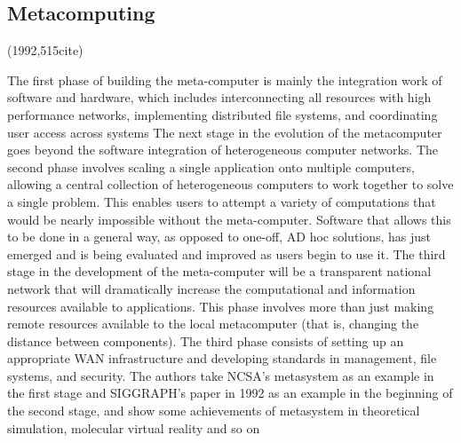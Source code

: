 \documentclass[a4paper,twoside]{scrbook}
\begin{document}
\subsection{Metacomputing \cite{smarr1992metacomputing}}
(1992,515cite)\par
The first phase of building the meta-computer is mainly the integration work of software and hardware, which includes interconnecting all resources with high performance networks, implementing distributed file systems, and coordinating user access across systems
The next stage in the evolution of the metacomputer goes beyond the software integration of heterogeneous computer networks. The second phase involves scaling a single application onto multiple computers, allowing a central collection of heterogeneous computers to work together to solve a single problem. This enables users to attempt a variety of computations that would be nearly impossible without the meta-computer. Software that allows this to be done in a general way, as opposed to one-off, AD hoc solutions, has just emerged and is being evaluated and improved as users begin to use it.
The third stage in the development of the meta-computer will be a transparent national network that will dramatically increase the computational and information resources available to applications. This phase involves more than just making remote resources available to the local metacomputer (that is, changing the distance between components). The third phase consists of setting up an appropriate WAN infrastructure and developing standards in management, file systems, and security.
The authors take NCSA's metasystem as an example in the first stage and SIGGRAPH's paper in 1992 as an example in the beginning of the second stage, and show some achievements of metasystem in theoretical simulation, molecular virtual reality and so on
\end{document}
